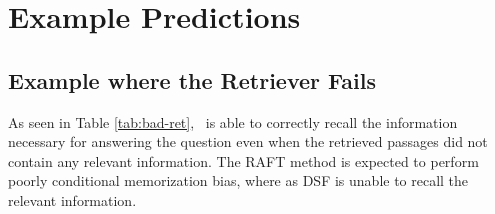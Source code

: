 \begin{table*}[h]
{
    }
    \caption{Prompt for filtering test data using Mixtral-8x22B-Instruct-v0.1. Here, \{question\} is a placeholder that will be replaced by the actual question.}
    \label{tab:filtering_prompt}
\end{table*}


\section{Example Predictions}

\subsection{Example where the Retriever Fails}

As seen in Table \ref{tab:bad-ret}, \ourmethodshort\ is able to correctly recall the information necessary for answering the question even when the retrieved passages did not contain any relevant information. The RAFT method is expected to perform poorly conditional memorization bias, where as DSF is unable to recall the relevant information.

